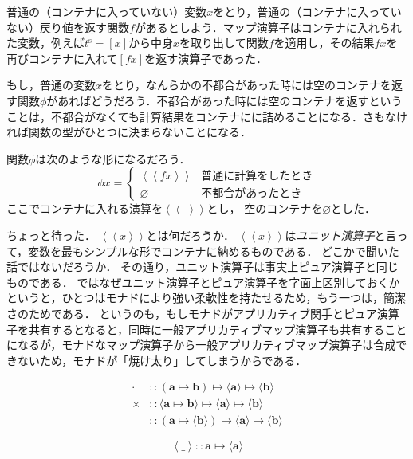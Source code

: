 \documentclass[a4paper,draft]{jsbook}
\newcommand{\keyword}[1]{{\underline{\emph{#1}}}}
\newcommand{\mListVar}[1]{{#1}^\mathrm{s}}
\newcommand{\mathTypeParameter}[1]{\mathbf{#1}}
\newcommand{\mathPureWith}[1]{\left\langle#1\right\rangle}
\newcommand{\mathUnitWith}[1]{\left\langle\!\left\langle#1\right\rangle\!\right\rangle}
\newcommand{\mathPureNothing}{\varnothing}
\newcommand{\mathAny}{\_}
\newcommand{\mathApplicativeGeneralMap}{\mathbin{\times}}
\newcommand{\mathGeneralMap}{\mathbin{\cdot}}
\newcommand{\mathIn}{\mathrel{::}}
\newcommand{\mathMapsTo}{\mapsto}
\newcommand{\mathMorph}[2]{#1\mathMapsTo#2}
\newcommand{\mathMorphII}[3]{#1\mathMapsTo#2\mathMapsTo#3}
\DeclareMathOperator{\hsklMonadMap}{{DO NOT USE}--\heartsuit}
\begin{document}
普通の（コンテナに入っていない）変数$x$をとり，普通の（コンテナに入っていない）戻り値を返す関数$f$があるとしよう．マップ演算子はコンテナに入れられた変数，例えば$\mListVar{t}=[x]$から中身$x$を取り出して関数$f$を適用し，その結果$fx$を再びコンテナに入れて$[fx]$を返す演算子であった．

もし，普通の変数$x$をとり，なんらかの不都合があった時には空のコンテナを返す関数$\phi$があればどうだろう．不都合があった時には空のコンテナを返すということは，不都合がなくても計算結果をコンテナにに詰めることになる．さもなければ関数の型がひとつに決まらないことになる．

関数$\phi$は次のような形になるだろう．
$$\phi x=\begin{cases}\mathUnitWith{fx}&\text{普通に計算をしたとき}\\
\mathPureNothing&\text{不都合があったとき}\end{cases}$$
ここでコンテナに入れる演算を$\mathUnitWith{\mathAny}$とし，
空のコンテナを$\mathPureNothing$とした．

ちょっと待った．
$\mathUnitWith{x}$とは何だろうか．
$\mathUnitWith{x}$は\keyword{ユニット演算子}と言って，変数を最もシンプルな形でコンテナに納めるものである．
どこかで聞いた話ではないだろうか．
その通り，ユニット演算子は事実上ピュア演算子と同じものである．
ではなぜユニット演算子とピュア演算子を字面上区別しておくかというと，ひとつはモナドにより強い柔軟性を持たせるため，もう一つは，簡潔さのためである．
というのも，もしモナドがアプリカティブ関手とピュア演算子を共有するとなると，同時に一般アプリカティブマップ演算子も共有することになるが，モナドなマップ演算子から一般アプリカティブマップ演算子は合成できないため，モナドが「焼け太り」してしまうからである．

\begin{align*}
\mathGeneralMap&\mathIn{}\mathMorphII{(\mathMorph{\mathTypeParameter{a}}{\mathTypeParameter{b}})}{\langle\mathTypeParameter{a}\rangle}{\langle\mathTypeParameter{b}
\rangle}\\
\mathApplicativeGeneralMap&\mathIn{}\mathMorphII{\langle\mathMorph{\mathTypeParameter{a}}{\mathTypeParameter{b}}\rangle}{\langle\mathTypeParameter{a}\rangle}{\langle\mathTypeParameter{b}\rangle}\\
\hsklMonadMap&\mathIn{}\mathMorphII{(\mathMorph{\mathTypeParameter{a}}{\langle\mathTypeParameter{b}\rangle})}{\langle\mathTypeParameter{a}\rangle}{\langle{\mathTypeParameter{b}}\rangle}
\end{align*}

$$\mathPureWith{\mathAny}\mathIn\mathMorph{\mathTypeParameter{a}}{\langle\mathTypeParameter{a}\rangle}$$
\end{document}
